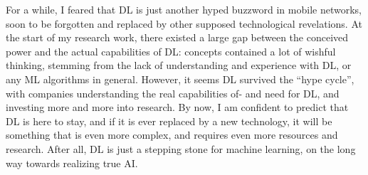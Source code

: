			For a while, I feared that \ac{DL} is just another hyped buzzword in mobile networks, soon to be forgotten and replaced by other supposed technological revelations.
			At the start of my research work, there existed a large gap between the conceived power and the actual capabilities of \ac{DL}: concepts contained a lot of wishful thinking, stemming from the lack of understanding and experience with \ac{DL}, or any \ac{ML} algorithms in general.
			However, it seems \ac{DL} survived the ``hype cycle'', with companies understanding the real capabilities of- and need for \ac{DL}, and investing more and more into research.
			By now, I am confident to predict that \ac{DL} is here to stay, and if it is ever replaced by a new technology, it will be something that is even more complex, and requires even more resources and research.
			After all, \ac{DL} is just a stepping stone for machine learning, on the long way towards realizing true \ac{AI}.

